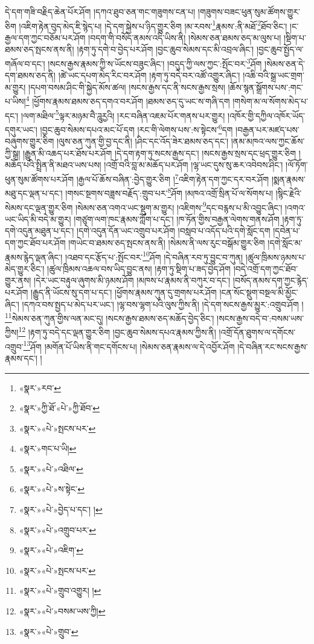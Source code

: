 དེ་དག་གཟི་བརྗིད་ཆེན་པོར་ཤོག །དཀའ་ཐུབ་ཅན་གང་གཟུགས་ངན་པ། །གཟུགས་བཟང་ཕུན་སུམ་ཚོགས་གྱུར་ཅིག །འཇིག་རྟེན་བུད་མེད་ཇི་སྙེད་པ། །དེ་དག་སྐྱེས་པ་ཉིད་གྱུར་ཅིག །མ་རབས་\footnote{«སྣར་»རབ་}རྣམས་:ནི་མཐོ་\footnote{«སྣར་»ཀྱི་ཐོ་«པེ་»ཀྱི་ཐོབ་}ཐོབ་ཅིང་། །ང་རྒྱལ་དག་ཀྱང་བཅོམ་པར་ཤོག །བདག་གི་བསོད་ནམས་འདི་ཡིས་ནི། །སེམས་ཅན་ཐམས་ཅད་མ་ལུས་པ། །སྡིག་པ་ཐམས་ཅད་སྤངས་ནས་ནི། །རྟག་ཏུ་དགེ་བ་བྱེད་པར་ཤོག །བྱང་ཆུབ་སེམས་དང་མི་འབྲལ་ཞིང་། །བྱང་ཆུབ་སྤྱོད་ལ་གཞོལ་བ་དང་། །སངས་རྒྱས་རྣམས་ཀྱི་ས་ཡོངས་བཟུང་ཞིང་། །བདུད་ཀྱི་ལས་ཀྱང་:སྤོང་བར་\footnote{«སྣར་»«པེ་»སྤངས་པར་}ཤོག །སེམས་ཅན་དེ་དག་ཐམས་ཅད་ནི། །ཚེ་ཡང་དཔག་མེད་རིང་བར་ཤོག །རྟག་ཏུ་བདེ་བར་འཚོ་འགྱུར་ཞིང་། །འཆི་བའི་སྒྲ་ཡང་གྲག་མ་གྱུར། །དཔག་བསམ་ཤིང་གི་སྐྱེད་མོས་ཚལ། །སངས་རྒྱས་དང་ནི་སངས་རྒྱས་སྲས། །ཆོས་སྙན་སྒྲོགས་པས་:གང་པ་ཡིས།\footnote{«སྣར་»གང་པ་ཡི།} །ཕྱོགས་རྣམས་ཐམས་ཅད་དགའ་བར་ཤོག །ཐམས་ཅད་དུ་ཡང་ས་གཞི་དག །གསེག་མ་ལ་སོགས་མེད་པ་དང་། །ལག་མཐིལ་\footnote{«སྣར་»«པེ་»འཐིལ་}ལྟར་མཉམ་བཻ་ཌཱུཪྱའི། །རང་བཞིན་འཇམ་པོར་གནས་པར་གྱུར། །འཁོར་གྱི་དཀྱིལ་འཁོར་ཡོད་དགུར་ཡང་། །བྱང་ཆུབ་སེམས་དཔའ་མང་པོ་དག །རང་གི་ལེགས་པས་:ས་སྟེངས་\footnote{«སྣར་»«པེ་»ས་སྟེང་}དག །བརྒྱན་པར་མཛད་པས་བཞུགས་གྱུར་ཅིག །ལུས་ཅན་ཀུན་གྱི་བྱ་དང་ནི། །ཤིང་དང་འོད་ཟེར་ཐམས་ཅད་དང་། །ནམ་མཁའ་ལས་ཀྱང་ཆོས་ཀྱི་སྒྲ། །རྒྱུན་མི་འཆད་པར་ཐོས་པར་ཤོག །དེ་དག་རྟག་ཏུ་སངས་རྒྱས་དང་། །སངས་རྒྱས་སྲས་དང་ཕྲད་གྱུར་ཅིག །མཆོད་པའི་སྤྲིན་ནི་མཐའ་ཡས་པས། །འགྲོ་བའི་བླ་མ་མཆོད་པར་ཤོག །ལྷ་ཡང་དུས་སུ་ཆར་འབེབས་ཤིང་། །ལོ་ཏོག་ཕུན་སུམ་ཚོགས་པར་ཤོག །རྒྱལ་པོ་ཆོས་བཞིན་:བྱེད་གྱུར་ཅིག །\footnote{«སྣར་»«པེ་»བྱེད་པ་དང་། །}འཇིག་རྟེན་དག་ཀྱང་དར་བར་ཤོག །སྨན་རྣམས་མཐུ་དང་ལྡན་པ་དང་། །གསང་སྔགས་བཟླས་བརྗོད་:གྲུབ་པར་\footnote{«སྣར་»«པེ་»འགྲུབ་པར་}ཤོག །མཁའ་འགྲོ་སྲིན་པོ་ལ་སོགས་པ། །སྙིང་རྗེའི་སེམས་དང་ལྡན་གྱུར་ཅིག །སེམས་ཅན་འགའ་ཡང་སྡུག་མ་གྱུར། །འཇིགས་\footnote{«སྣར་»«པེ་»འཇིག་}དང་བརྙས་པ་མི་འབྱུང་ཞིང་། །འགའ་ཡང་ཡིད་མི་བདེ་མ་གྱུར། །གཙུག་ལག་ཁང་རྣམས་ཀློག་པ་དང་། །ཁ་ཏོན་གྱིས་བརྒྱན་ལེགས་གནས་ཤོག །རྟག་ཏུ་དགེ་འདུན་མཐུན་པ་དང་། །དགེ་འདུན་དོན་ཡང་འགྲུབ་པར་ཤོག །བསླབ་པ་འདོད་པའི་དགེ་སློང་དག །དབེན་པ་དག་ཀྱང་ཐོབ་པར་ཤོག །གཡེང་བ་ཐམས་ཅད་སྤངས་ནས་ནི། །སེམས་ནི་ལས་རུང་བསྒོམ་གྱུར་ཅིག །དགེ་སློང་མ་རྣམས་རྙེད་ལྡན་ཞིང་། །འཐབ་དང་རྩོད་པ་:སྤོང་བར་\footnote{«སྣར་»«པེ་»སྤངས་པར་}ཤོག །དེ་བཞིན་རབ་ཏུ་བྱུང་བ་ཀུན། །ཚུལ་ཁྲིམས་ཉམས་པ་མེད་གྱུར་ཅིང་། །ཚུལ་ཁྲིམས་འཆལ་བས་ཡིད་བྱུང་ནས། །རྟག་ཏུ་སྡིག་པ་ཟད་བྱེད་ཤོག །བདེ་འགྲོ་དག་ཀྱང་ཐོབ་གྱུར་ནས། །དེར་ཡང་བརྟུལ་ཞུགས་མི་ཉམས་ཤོག །མཁས་པ་རྣམས་ནི་བཀུར་བ་དང་། །བསོད་ནམས་དག་ཀྱང་རྙེད་པར་ཤོག །རྒྱུད་ནི་ཡོངས་སུ་དག་པ་དང་། །ཕྱོགས་རྣམས་ཀུན་དུ་གྲགས་པར་ཤོག །ངན་སོང་སྡུག་བསྔལ་མི་མྱོང་ཞིང་། །དཀའ་བས་སྤྱད་པ་མེད་པར་ཡང་། །ལྷ་བས་ལྷག་པའི་ལུས་ཀྱིས་ནི། །དེ་དག་སངས་རྒྱས་མྱུར་:འགྲུབ་ཤོག །\footnote{«སྣར་»«པེ་»གྲུབ་འགྱུར། །}སེམས་ཅན་ཀུན་གྱིས་ལན་མང་དུ། །སངས་རྒྱས་ཐམས་ཅད་མཆོད་བྱེད་ཅིང་། །སངས་རྒྱས་བདེ་བ་:བསམ་ཡས་ཀྱིས།\footnote{«སྣར་»«པེ་»བསམ་ཡས་ཀྱི།} །རྟག་ཏུ་བདེ་དང་ལྡན་གྱུར་ཅིག །བྱང་ཆུབ་སེམས་དཔའ་རྣམས་ཀྱིས་ནི། །འགྲོ་དོན་ཐུགས་ལ་དགོངས་འགྲུབ་\footnote{«སྣར་»«པེ་»གྲུབ་}ཤོག །མགོན་པོ་ཡིས་ནི་གང་དགོངས་པ། །སེམས་ཅན་རྣམས་ལ་དེ་འབྱོར་ཤོག །དེ་བཞིན་རང་སངས་རྒྱས་རྣམས་དང་། །
